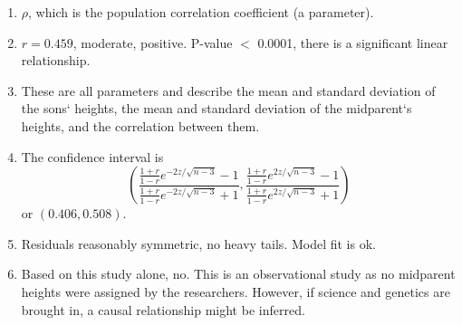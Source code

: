 \documentclass{report}
\begin{document}
\begin{enumerate}
\item $\rho$, which is the population correlation coefficient (a parameter).
\item $r=0.459$, moderate, positive.  P-value $<$ 0.0001, there is a significant linear relationship.
\item These are all parameters and describe the mean and standard deviation of the sons` heights, the mean and standard deviation of the midparent`s heights, and the correlation between them.
\item The confidence interval is 
$$ \left(\frac{\frac{1+r}{1-r}e^{-2z/\sqrt{n-3}}-1}{\frac{1+r}{1-r}e^{-2z/\sqrt{n-3}}+1}, 
\frac{\frac{1+r}{1-r}e^{2z/\sqrt{n-3}}-1}{\frac{1+r}{1-r}e^{2z/\sqrt{n-3}}+1}\right)$$
or $(0.406,0.508)$.
\item Residuals reasonably symmetric, no heavy tails.  Model fit is ok.
\item Based on this study alone, no.  This is an observational study as no midparent heights were assigned by the researchers.  However, if science and genetics are brought in, a causal relationship might be inferred.
\end{enumerate}

\newpage
\end{document}
